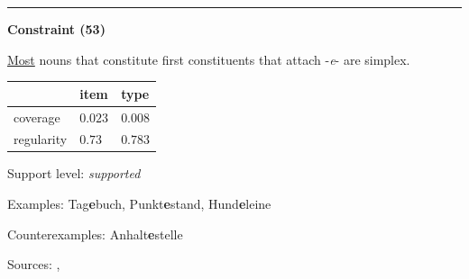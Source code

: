 \hrule




\vspace{0.4em}

\begin{center}
\textbf{Constraint (53)}
\end{center}

\noindent
\underline{Most} nouns that constitute first constituents that attach -\textit{e}- are simplex.
\vspace{0.35em}


\vspace{-0.35em}

\begin{table}[!ht]
\begin{center}

\begin{tabularx}{\columnwidth}{|X|X|X|}
\hline
 & item & type \\
\hline
 coverage & $0.023$ & $0.008$ \\
\hline
 regularity & $0.73$ & $0.783$ \\
\hline
\end{tabularx}
\end{center}
\end{table}

\vspace{-1.35em}

\noindent
Support level: \textit{supported}

\vspace{0.3em}

\noindent
Examples: Tag\textbf{e}buch, Punkt\textbf{e}stand, Hund\textbf{e}leine

\noindent
Counterexamples: Anhalt\textbf{e}stelle

\vspace{0.3em}

\noindent
Sources: \citet[9, 18]{kuerschner_2010}, \citet[102]{ortner_mueller-bollhagen_1991}


